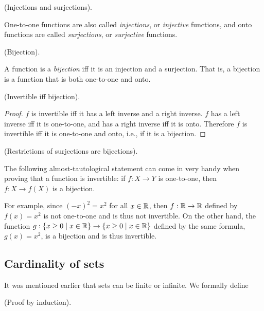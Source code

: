 \begin{remark}
    (Injections and surjections).

    One-to-one functions are also called \textit{injections}, or \textit{injective} functions, and onto functions are called \textit{surjections}, or \textit{surjective} functions.
\end{remark}

\begin{defn}
    (Bijection).

    A function is a \textit{bijection} iff it is an injection and a surjection. That is, a bijection is a function that is both one-to-one and onto.
\end{defn}

\begin{theorem}
\label{ch::logic_pf_fns::thm::invertible_iff_bijection}
    (Invertible iff bijection).
\end{theorem}

\begin{proof}
    $f$ is invertible iff it has a left inverse and a right inverse. $f$ has a left inverse iff it is one-to-one, and has a right inverse iff it is onto. Therefore $f$ is invertible iff it is one-to-one and onto, i.e., if it is a bijection.
\end{proof}

\begin{remark}
    (Restrictions of surjections are bijections).

    The following almost-tautological statement can come in very handy when proving that a function is invertible: if $f:X \rightarrow Y$ is one-to-one, then $f:X \rightarrow f(X)$ is a bijection.

    For example, since $(-x)^2 = x^2$ for all $x \in \mathbb{R}$, then $f:\mathbb{R} \rightarrow \mathbb{R}$ defined by $f(x) = x^2$ is not one-to-one and is thus not invertible. On the other hand, the function $g: \{x \geq 0 \mid x \in \mathbb{R}\} \rightarrow \{x \geq 0 \mid x \in \mathbb{R}\}$ defined by the same formula, $g(x) = x^2$, is a bijection and is thus invertible.
\end{remark}

\subsection*{Cardinality of sets}

It was mentioned earlier that sets can be finite or infinite. We formally define

\begin{defn}
    (Proof by induction).
    
    
\end{defn}

